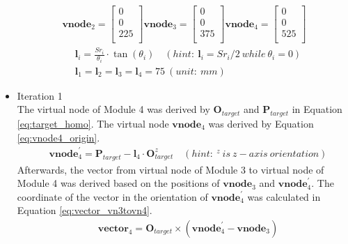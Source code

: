 \begin{itemize}
\begin{align}
        \textbf{vnode}_{2} = \begin{bmatrix} 0 \\ 0 \\ 225 \\ \end{bmatrix} 
        \textbf{vnode}_{3} = \begin{bmatrix} 0 \\ 0 \\ 375 \\ \end{bmatrix} 
        \textbf{vnode}_{4} = \begin{bmatrix} 0 \\ 0 \\ 525 \\ \end{bmatrix} 
        \label{eq:virtual_node_initial} 
    \end{align}
    \vspace{-10mm}
    \begin{align}
        &\textbf{l}_{i} = \frac{Sr_i}{\theta_i}\cdot \tan(\theta_i)
        \quad (hint: \ \textbf{l}_{i} = {Sr}_i/2 \ while \ \theta_i = 0) \label{eq:virtual_length}\\
        &\textbf{l}_{1} = \textbf{l}_{2} = \textbf{l}_{3} = \textbf{l}_{4} = 75 \ (unit: \ mm) \nonumber
    \end{align}
    \item Iteration 1 \\ %
    The virtual node of Module 4 was derived by $\textbf{O}_{target}$ and $\textbf{P}_{target}$ in Equation 
    \ref{eq:target_homo}. The virtual node $\textbf{vnode}_{4}$ was derived by Equation \ref{eq:vnode4_origin}.
    \vspace{-5mm}
    \begin{align}
        &\textbf{vnode}_{4}^{'} = \textbf{P}_{target} - \textbf{l}_{4} \cdot \textbf{O}_{target}^{z} \quad 
        (hint: \ ^{z} \ is \ z-axis \ orientation)
        \label{eq:vnode4_origin}
    \end{align}
    Afterwards, the vector from virtual node of Module 3 to virtual node of Module 4 was derived based on the 
    positions of $\textbf{vnode}_{3}$ and $\textbf{vnode}_{4}^{'}$. The coordinate of the vector in the orientation 
    of $\textbf{vnode}_{4}^{'}$ was calculated in Equation \ref{eq:vector_vn3tovn4}. 
    \vspace{-5mm}
    \begin{align}
        &\textbf{vector}_{4} = \textbf{O}_{target} \times (\textbf{vnode}_{4}^{'} - \textbf{vnode}_{3}) 

\end{align}
\end{itemize}
